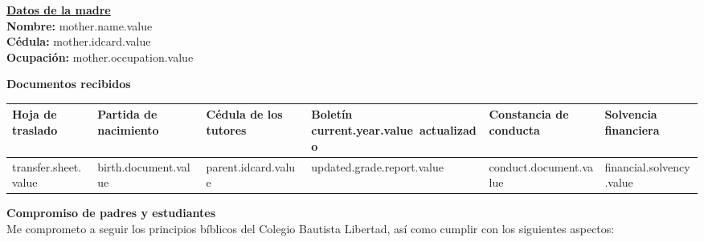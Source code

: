 \documentclass[12pt]{article}
\newcommand{\aField}[1]{#1}
\newcommand{\motherName}{mother.name.value}
\newcommand{\motherIdcard}{mother.idcard.value}
\newcommand{\motherOccupation}{mother.occupation.value}
\newcommand{\transferSheet}{transfer.sheet.value}
\newcommand{\currentYear}{current.year.value}
\newcommand{\birthDocument}{birth.document.value}
\newcommand{\parentIdcard}{parent.idcard.value}
\newcommand{\updatedGradeReport}{updated.grade.report.value}
\newcommand{\conductDocument}{conduct.document.value}
\newcommand{\financialSolvency}{financial.solvency.value}
\begin{document}
    \hfill
    \begin{minipage}[t]{0.49\textwidth}
        \textbf{\uline{Datos de la madre}}\\[1mm]
        \textbf{Nombre:} \aField{\motherName}\\
        \textbf{Cédula:} \aField{\motherIdcard}\\
        \textbf{Ocupación:} \aField{\motherOccupation}
    \end{minipage}
    \par\vspace{7mm}
    \textbf{Documentos recibidos}
    \begin{table}[H]
        \centering
        \begin{tabular}{|p{1.8cm}|p{2.3cm}|p{2.2cm}|p{2.5cm}|p{2.5cm}|p{2cm}|}
            \hline
            Hoja de traslado &
            Partida de nacimiento &
            Cédula de los tutores &
            Boletín \currentYear\ actualizado &
            Constancia de conducta &
            Solvencia financiera\\
            \hline
            \hspace{6mm}\transferSheet &
            \hspace{9mm}\birthDocument &
            \hspace{9mm}\parentIdcard &
            \hspace{10mm}\updatedGradeReport &
            \hspace{10mm}\conductDocument &
            \hspace{7mm}\financialSolvency\\
            \hline
        \end{tabular}
    \end{table}
    \textbf{Compromiso de padres y estudiantes}\\
    Me comprometo a seguir los principios bíblicos del Colegio Bautista Libertad, así como cumplir con los siguientes aspectos:
\end{document}
